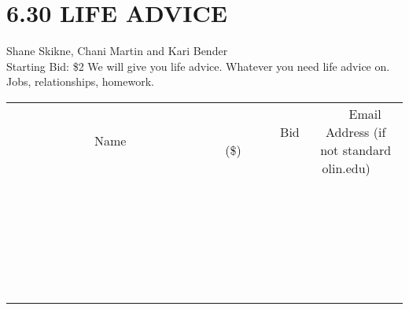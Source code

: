 \documentclass[11pt]{article}
\begin{document}
\section*{6.30 LIFE ADVICE}
Shane Skikne, Chani  Martin and Kari Bender
\\
Starting Bid: \$2
\newline
We will give you life advice. Whatever you need life advice on. Jobs, relationships, homework.
\\[6ex]
\begin{tabular}{c c c}
~~~~~~~~~~~~~Name~~~~~~~~~~~~~ & ~~~~~~~~~Bid (\$)~~~~~~~~~  & ~~~Email Address (if not standard olin.edu)~~~\\
 & & \\
\hline
 & & \\
\hline
 & & \\
\hline
 & & \\
\hline
 & & \\
\hline
 & & \\
\hline
 & & \\
\hline
 & & \\
\hline
 & & \\
\hline
 & & \\
\hline
 & & \\
\hline
 & & \\
\hline
 & & \\
\hline
 & & \\
\hline
 & & \\
\hline
 & & \\
\hline
 & & \\
\hline
 & & \\
\hline
 & & \\
\hline
 & & \\
\hline
 & & \\
\hline
 & & \\
\hline
 & & \\
\hline
 & & \\
\hline
 & & \\
\hline
 & & \\
\hline
\end{tabular}
\newpage
\end{document}
